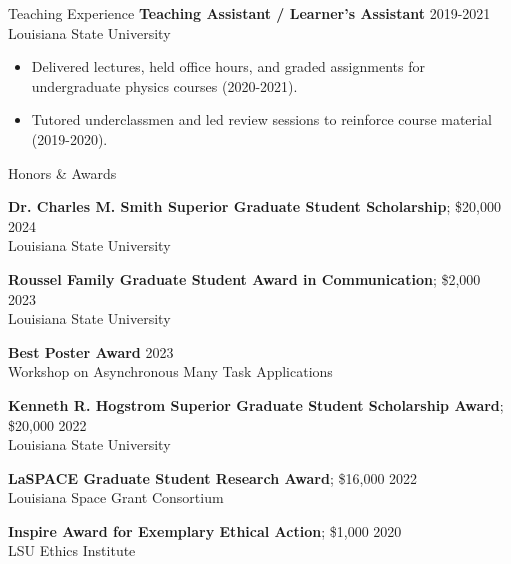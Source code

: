 \documentclass[
	11pt, %
]{resume} %
\begin{document}
\begin{rSection}{Teaching Experience}
	\textbf{Teaching Assistant / Learner's Assistant} \hfill 2019-2021 \\
	Louisiana State University
	\vspace{-.2cm}
	\begin{itemize}[label=$\cdot$]
		\itemsep-0.5em
		\item Delivered lectures, held office hours, and graded assignments for undergraduate physics courses (2020-2021).
		\item Tutored underclassmen and led review sessions to reinforce course material (2019-2020).
	\end{itemize}

\end{rSection}
\vspace{0.5cm}


\begin{rSection}{Honors \& Awards}

	\textbf{Dr. Charles M. Smith Superior Graduate Student Scholarship}; \$20,000 \hfill 2024 \\
	Louisiana State University

	\textbf{Roussel Family Graduate Student Award in Communication}; \$2,000 \hfill 2023 \\
	Louisiana State University

	\textbf{Best Poster Award} \hfill 2023 \\
	Workshop on Asynchronous Many Task Applications

	\textbf{Kenneth R. Hogstrom Superior Graduate Student Scholarship Award}; \$20,000 \hfill 2022 \\
	Louisiana State University

	\textbf{LaSPACE Graduate Student Research Award}; \$16,000 \hfill 2022 \\
	Louisiana Space Grant Consortium

	\textbf{Inspire Award for Exemplary Ethical Action}; \$1,000 \hfill 2020 \\
	LSU Ethics Institute

\end{rSection}
\vspace{0.5cm}


\end{document}
